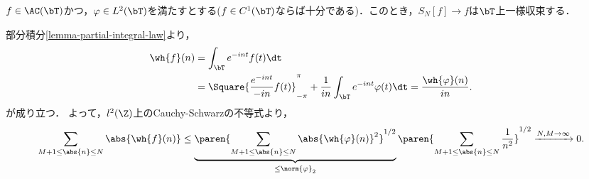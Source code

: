 \documentclass[uplatex,dvipdfmx]{jsreport}
\begin{document}
\begin{proposition}[証明のアイデア]\label{prop-idea-of-uniform-convergence-of-Fourier-series}
    $f\in\AC(\bT)$かつ，$\varphi\in L^2(\bT)$を満たすとする($f\in C^1(\bT)$ならば十分である)．このとき，$S_N[f]\to f$は$\bT$上一様収束する．
\end{proposition}
\begin{Proof}
    部分積分\ref{lemma-partial-integral-law}より，
    \begin{align*}
        \wh{f}(n)&=\int_\bT e^{-int}f(t)\dt\\
        &=\Square{\frac{e^{-int}}{-in}f(t)}^\pi_{-\pi}+\frac{1}{in}\int_\bT e^{-int}\varphi(t)\dt=\frac{\wh{\varphi}(n)}{in}.
    \end{align*}
    が成り立つ．
    よって，$l^2(\Z)$上のCauchy-Schwarzの不等式より，
    \[\sum_{M+1\le\abs{n}\le N}\abs{\wh{f}(n)}\le\underbrace{\paren{\sum_{M+1\le\abs{n}\le N}\abs{\wh{\varphi}(n)}^2}^{1/2}}_{\le\norm{\varphi}_2}\paren{\sum_{M+1\le\abs{n}\le N}\frac{1}{n^2}}^{1/2}\xrightarrow{N,M\to\infty}0.\]
\end{Proof}
\end{document}
